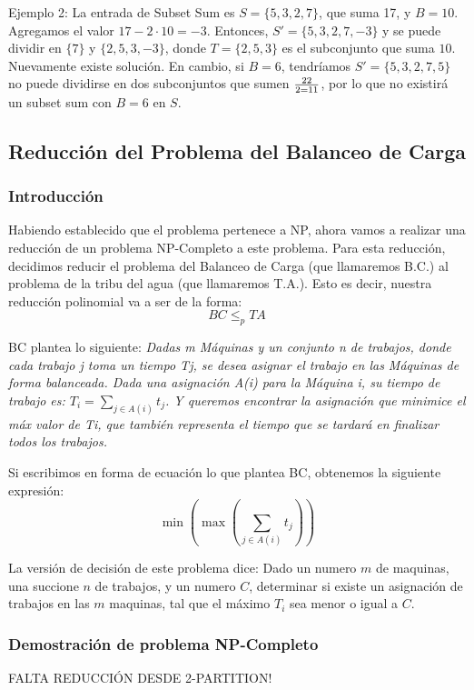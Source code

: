 \documentclass{article}
\begin{document}
Ejemplo 2: La entrada de Subset Sum es \( S = \{5, 3, 2, 7\} \), que suma 17, y \( B = 10 \). Agregamos el valor $17 - 2 \cdot 10 = -3$. Entonces, \( S' = \{5, 3, 2, 7, -3\} \) y se puede dividir en  \( \{7\} \) y \( \{2, 5, 3, -3\} \), donde \( T = \{2, 5, 3\} \) es el subconjunto que suma \( 10 \). Nuevamente existe solución. En cambio, si $B = 6$, tendríamos \( S' = \{5, 3, 2, 7, 5\} \) no puede dividirse en dos subconjuntos que sumen $22 \over 2 = 11$, por lo que no existirá un subset sum con $B = 6$ en $S$.

\subsection{Reducción del Problema del Balanceo de Carga}
\subsubsection{Introducción}
Habiendo establecido que el problema pertenece a NP, ahora vamos a realizar una reducción de un problema NP-Completo a este problema.
Para esta reducción, decidimos reducir el problema del Balanceo de Carga (que llamaremos B.C.) al problema de la tribu del agua (que llamaremos T.A.). Esto es decir, nuestra reducción polinomial va a ser de la forma:
$$
BC \leq_p TA
$$

BC plantea lo siguiente: 
\textit{Dadas m Máquinas y un conjunto n de trabajos, donde cada trabajo j toma un tiempo Tj, se desea asignar el trabajo en las Máquinas de forma balanceada. Dada una asignación A(i) para la Máquina i, su tiempo de trabajo es: $T_{i} =\displaystyle{\sum_{j \in A(i)} t_j}$. Y queremos encontrar la asignación que minimice el máx valor de Ti, que también representa el tiempo que se tardará en finalizar todos los trabajos.}

Si escribimos en forma de ecuación lo que plantea BC, obtenemos la siguiente expresión:
$$
\min( \max (\displaystyle{\sum_{j \in A(i)} t_j}))
$$

La versión de decisión de este problema dice: Dado un numero $m$ de maquinas, una succione $n$ de trabajos, y un numero $C$, determinar si existe un asignación de trabajos en las $m$ maquinas, tal que el máximo $T_i$ sea menor o igual a $C$.

\subsubsection{Demostración de problema NP-Completo}
FALTA REDUCCIÓN DESDE 2-PARTITION!
\end{document}
